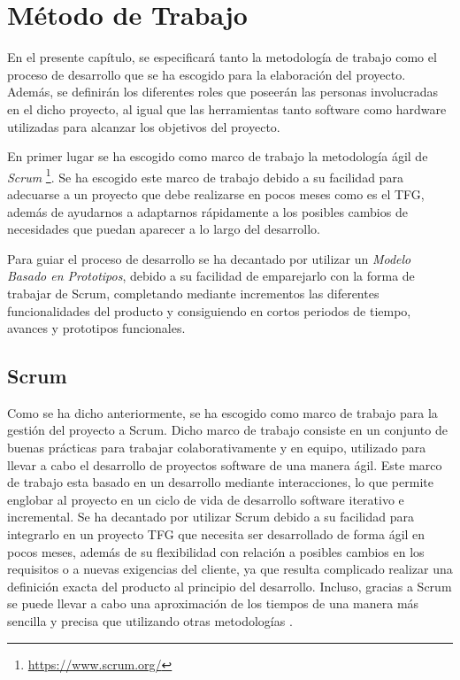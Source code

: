 \chapter{Método de Trabajo}
\label{cap:Metodologia}

En el presente capítulo, se especificará tanto la metodología de trabajo como el proceso de desarrollo que se ha escogido para la elaboración del proyecto. Además, se definirán los diferentes roles que poseerán las personas involucradas en el dicho proyecto, al igual que las herramientas tanto software como hardware utilizadas para alcanzar los objetivos del proyecto.

En primer lugar se ha escogido como marco de trabajo la metodología ágil de \emph{Scrum} \footnote{\url{https://www.scrum.org/}}. Se ha escogido este marco de trabajo debido a su facilidad para adecuarse a un proyecto que debe realizarse en pocos meses como es el TFG, además de ayudarnos a adaptarnos rápidamente a los posibles cambios de necesidades que puedan aparecer a lo largo del desarrollo.

Para guiar el proceso de desarrollo se ha decantado por utilizar un \emph{Modelo Basado en Prototipos}, debido a su facilidad de emparejarlo con la forma de trabajar de Scrum, completando mediante incrementos las diferentes funcionalidades del producto y consiguiendo en cortos periodos de tiempo, avances y prototipos funcionales.

\section{Scrum}
\label{sec:Scrum}

Como se ha dicho anteriormente, se ha escogido como marco de trabajo para la gestión del proyecto a Scrum. Dicho marco de trabajo consiste en un conjunto de buenas prácticas para trabajar colaborativamente y en equipo, utilizado para llevar a cabo el desarrollo de proyectos software de una manera ágil. Este marco de trabajo esta basado en un desarrollo mediante interacciones, lo que permite englobar al proyecto en un ciclo de vida de desarrollo software iterativo e incremental. Se ha decantado por utilizar Scrum debido a su facilidad para integrarlo en un proyecto TFG que necesita ser desarrollado de forma ágil en pocos meses, además de su flexibilidad con relación a posibles cambios en los requisitos o a nuevas exigencias del cliente, ya que resulta complicado realizar una definición exacta del producto al principio del desarrollo. Incluso, gracias a Scrum se puede llevar a cabo una aproximación de los tiempos de una manera más sencilla y precisa que utilizando otras metodologías \cite{schwaber2013guia}. 

